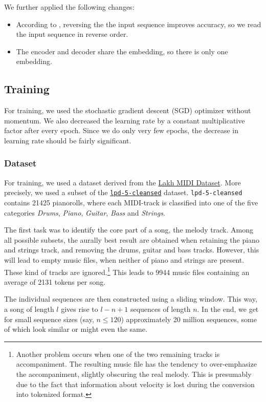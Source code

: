 \documentclass[a4paper]{article}
\begin{document}
We further applied the following changes:
\begin{itemize}
\item According to \cite{sutskever2014sequence}, reversing the the input sequence improves accuracy, so we read the input sequence in reverse order.
\item The encoder and decoder share the embedding, so there is only one embedding.
\end{itemize}

\subsection{Training}
For training, we used the stochastic gradient descent (SGD) optimizer without momentum. We also decreased the learning rate by a constant multiplicative factor after every epoch. Since we do only very few epochs, the decrease in learning rate should be fairly significant.

\subsubsection{Dataset}
For training, we used a dataset derived from the \href{https://colinraffel.com/projects/lmd/}{Lakh MIDI Dataset}. More precisely, we used a subset of the \href{https://salu133445.github.io/lakh-pianoroll-dataset/dataset#lpd-5}{\texttt{lpd-5-cleansed}} dataset. \texttt{lpd-5-cleansed} contains 21425 pianorolls, where each MIDI-track is classified into one of the five categories \emph{Drums}, \emph{Piano}, \emph{Guitar}, \emph{Bass} and \emph{Strings}.

The first task was to identify the core part of a song, the melody track. Among all possible subsets, the aurally best result are obtained when retaining the piano and strings track, and removing the drums, guitar and bass tracks. However, this will lead to empty music files, when neither of piano and strings are present. These kind of tracks are ignored.\footnote{Another problem occurs when one of the two remaining tracks is accompaniment. The resulting music file has the tendency to over-emphasize the accompaniment, slightly obscuring the real melody. This is presumably due to the fact that information about velocity is lost during the conversion into tokenized format.} This leads to 9944 music files containing an average of 2131 tokens per song.

The individual sequences are then constructed using a sliding window. This way, a song of length $l$ gives rise to $l-n+1$ sequences of length $n$. In the end, we get for small sequence sizes (say, $n \leq 120$) approximately 20 million sequences, some of which look similar or might even the same.
\end{document}
